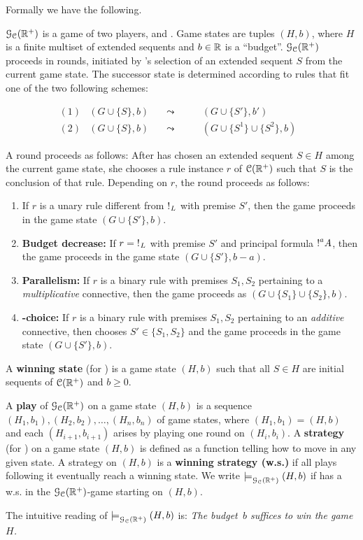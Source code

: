 Formally we have the following.
\begin{definition}\label{definition:GAIMALLR}
$\mathcal{G}_{\mathcal{C}}(\mathbb{R}^+)$ is a game of two players, \I and \II. Game states are tuples $(H,b)$, where $H$ is a finite multiset of extended sequents and $b\in\mathbb{R}$ is a ``budget''.
$\mathcal{G}_{\mathcal{C}}(\mathbb{R}^+)$ proceeds in rounds, initiated by \I's selection of an extended sequent $S$ from the current game state. The successor state is determined according to rules that fit one of the two following schemes:

\[
\begin{array}{lllll}
{(1)} &(G\cup\{S\},b)&\quad\leadsto\quad&  \quad (G\cup\{S'\},b') & \\
{(2)} &(G\cup\{S\},b)&\quad\leadsto\quad&  \quad (G\cup\{S^1\}\cup\{S^2\},b)
\end{array}
\]

A round proceeds as follows: After \I has chosen an extended sequent $S\in H$ among the current game state, she chooses a rule  instance  $r$ of $\mathcal{C}(\mathbb{R}^+)$ such that $S$ is the conclusion of that rule. Depending on  $r$, the round proceeds as follows:
\begin{enumerate}
\item If $r$ is a unary rule different from $\hbox{$\mathop{!}^{}$}_L$ with premise $S'$, then the game proceeds in the game state $(G\cup\{S'\},b)$.
\item {\bf Budget decrease:} If $r=\hbox{$\mathop{!}^{}$}_L$ with premise $S'$ and principal formula $\hbox{$\mathop{!}^{a}$}A$, then the game proceeds in the game state $(G\cup\{S'\},b-a)$.
\item {\bf Parallelism:} If $r$ is a binary rule with premises $S_1,S_2$ pertaining to a \emph{multiplicative} connective, then the game proceeds as $(G\cup\{S_1\}\cup\{S_2\},b)$.
\item {\bf \II-choice:} If $r$ is a binary rule with premises $S_1,S_2$ pertaining to an \emph{additive} connective, then \II chooses $S'\in\{S_1,S_2\}$ and the game proceeds in the game state $(G\cup\{S'\},b)$.
\end{enumerate}

\noindent A {\bf winning state} (for \I) is a game state $(H,b)$ such that all $S\in H$ are initial sequents of $\mathcal{C}(\mathbb{R}^+)$ and $b\geq 0$.
\end{definition}

\begin{definition}
A {\bf play} of $\mathcal{G}_{\mathcal{C}}(\mathbb{R}^+)$ on a game state $(H,b)$ is a sequence $(H_1,b_1),(H_2,b_2),\ldots,(H_n,b_n)$ of game states, where $(H_1,b_1)=(H,b)$ and each $(H_{i+1},b_{i+1})$ arises by playing one round on $(H_i,b_i)$.
 A {\bf strategy} (for \I) on a game state $(H,b)$ is defined as a function telling \I how to move in any given state. 
 A strategy on $(H,b)$ is a {\bf winning strategy (w.s.)} if all plays following it eventually reach a winning state.
We write $\models^{}_{\mathcal{G}_{\mathcal{C}}(\mathbb{R}^+)}(H,b)$ if \I has a w.s. in the $\mathcal{G}_{\mathcal{C}}(\mathbb{R}^+)$-game starting on $(H,b)$. 
\end{definition}
The intuitive reading of $\models^{}_{\mathcal{G}_{\mathcal{C}}(\mathbb{R}^+)}(H,b)$ is: \textit{The budget~$b$ suffices to win the game $H$.}

